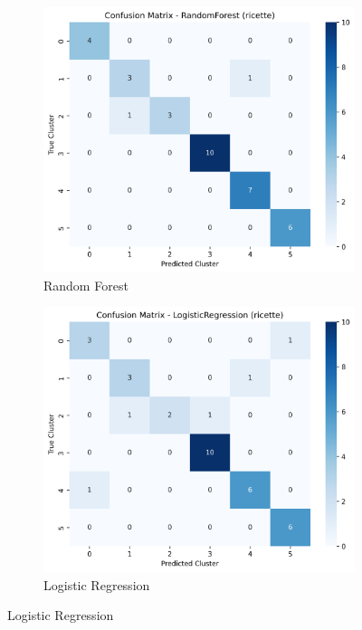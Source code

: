 \documentclass[12pt,a4paper]{article}
\begin{document}
\begin{figure}[H]
\centering
\begin{subfigure}{0.32\textwidth}
    \includegraphics[width=\textwidth]{dati/confusion_matrix_randomforest_ricette.png}
    \caption{Random Forest}
\end{subfigure}
\hfill
\begin{subfigure}{0.32\textwidth}
    \includegraphics[width=\textwidth]{dati/confusion_matrix_logisticregression_ricette.png}
    \caption{Logistic Regression}

\end{subfigure}
\end{figure}
\end{document}
